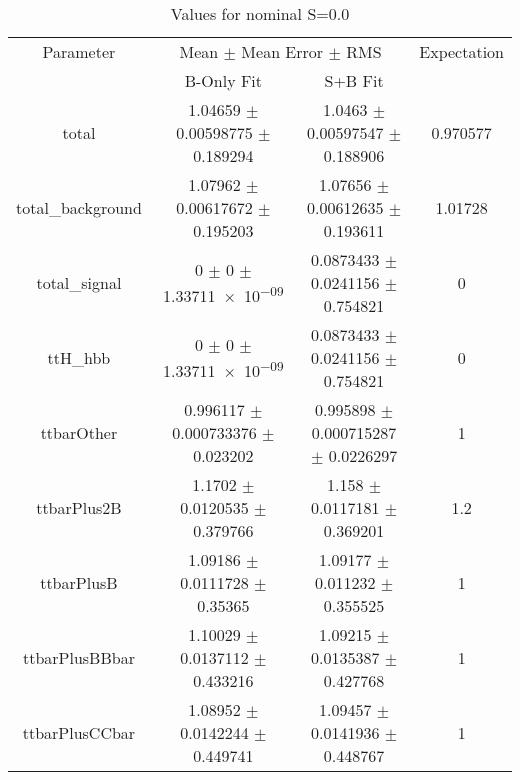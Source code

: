 \begin{table}
\centering
\caption{Values for nominal S=0.0}
\begin{tabular}{cccc}
\toprule
Parameter & \multicolumn{2}{c}{Mean $\pm$ Mean Error $\pm$ RMS} & Expectation\\
 & B-Only Fit & S+B Fit & \\
\midrule
total & \num{1.04659} $\pm$ \num{0.00598775} $\pm$ \num{0.189294} & \num{1.0463} $\pm$ \num{0.00597547} $\pm$ \num{0.188906} & \num{0.970577}\\
total\_background & \num{1.07962} $\pm$ \num{0.00617672} $\pm$ \num{0.195203} & \num{1.07656} $\pm$ \num{0.00612635} $\pm$ \num{0.193611} & \num{1.01728}\\
total\_signal & \num{0} $\pm$ \num{0} $\pm$ \num{1.33711e-09} & \num{0.0873433} $\pm$ \num{0.0241156} $\pm$ \num{0.754821} & \num{0}\\
ttH\_hbb & \num{0} $\pm$ \num{0} $\pm$ \num{1.33711e-09} & \num{0.0873433} $\pm$ \num{0.0241156} $\pm$ \num{0.754821} & \num{0}\\
ttbarOther & \num{0.996117} $\pm$ \num{0.000733376} $\pm$ \num{0.023202} & \num{0.995898} $\pm$ \num{0.000715287} $\pm$ \num{0.0226297} & \num{1}\\
ttbarPlus2B & \num{1.1702} $\pm$ \num{0.0120535} $\pm$ \num{0.379766} & \num{1.158} $\pm$ \num{0.0117181} $\pm$ \num{0.369201} & \num{1.2}\\
ttbarPlusB & \num{1.09186} $\pm$ \num{0.0111728} $\pm$ \num{0.35365} & \num{1.09177} $\pm$ \num{0.011232} $\pm$ \num{0.355525} & \num{1}\\
ttbarPlusBBbar & \num{1.10029} $\pm$ \num{0.0137112} $\pm$ \num{0.433216} & \num{1.09215} $\pm$ \num{0.0135387} $\pm$ \num{0.427768} & \num{1}\\
ttbarPlusCCbar & \num{1.08952} $\pm$ \num{0.0142244} $\pm$ \num{0.449741} & \num{1.09457} $\pm$ \num{0.0141936} $\pm$ \num{0.448767} & \num{1}\\
\bottomrule
\end{tabular}
\end{table}